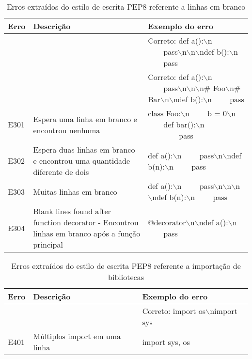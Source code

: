 	\begin{table}
		\scriptsize
		\begin{tabularx}{\linewidth}{ |l|X|X| }
			\hline
			\textbf{Erro}
			& \textbf{Descrição}
			& \textbf{Exemplo do erro} \\
			\hline
			
			& 
			& Correto: def a():$\backslash$n \ \ \ \ pass$\backslash$n$\backslash$n$\backslash$ndef b():$\backslash$n \ \ \ \ pass \\ 
			\hline
			
			& 
			& Correto: def a():$\backslash$n \ \ \ \ pass$\backslash$n$\backslash$n$\backslash$n\# Foo$\backslash$n\# Bar$\backslash$n$\backslash$ndef b():$\backslash$n \ \ \ \ pass \\ 
			\hline
			E301 
			& Espera uma linha em branco e encontrou nenhuma 
			& class Foo:$\backslash$n \ \ \ \ b = 0$\backslash$n \ \ \ \ def bar():$\backslash$n \ \ \ \  \ \ \ \ pass \\ 
			\hline
			E302 
			& Espera duas linhas em branco e encontrou uma quantidade diferente de dois 
			& def a():$\backslash$n \ \ \ \ pass$\backslash$n$\backslash$ndef b(n):$\backslash$n \ \ \ \ pass \\ 
			\hline
			E303 
			& Muitas linhas em branco 
			& def a():$\backslash$n \ \ \ \ pass$\backslash$n$\backslash$n$\backslash$n$\backslash$ndef b(n):$\backslash$n \ \ \ \ pass \\ 
			\hline
			E304 
			& Blank lines found after function decorator - Encontrou linhas em branco após a função principal 
			& @decorator$\backslash$n$\backslash$ndef a():$\backslash$n \ \ \ \ pass \\ 
			\hline
		\end{tabularx}
		\caption{Erros extraídos do estilo de escrita PEP8 referente a linhas em branco}
		\label{tab:pep8E300}
	\end{table}

	\begin{table}
		\scriptsize
		\begin{tabularx}{\linewidth}{ |l|X|X| }
			\hline
			\textbf{Erro}
			& \textbf{Descrição}
			& \textbf{Exemplo do erro} \\
			\hline
			
			& 
			& Correto: import os$\backslash$nimport sys \\ 
			\hline
			E401 
			& Múltiplos import em uma linha 
			& import sys, os \\ 
			\hline
		\end{tabularx}
		\caption{Erros extraídos do estilo de escrita PEP8 referente a importação de bibliotecas}
		\label{tab:pep8E400}
	\end{table}

